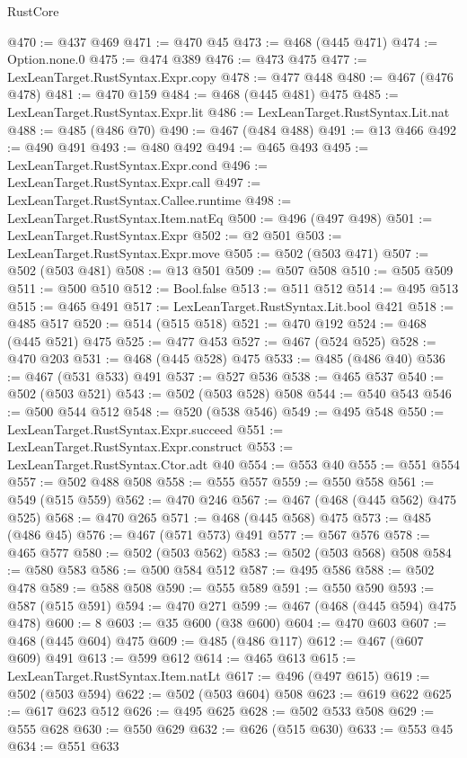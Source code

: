 \begin{lexlean}{RustCore}
\begin{coremodule}
@470 := @437 @469
@471 := @470 @45
@473 := @468 (@445 @471)
@474 := Option.none.{0}
@475 := @474 @389
@476 := @473 @475
@477 := LexLeanTarget.RustSyntax.Expr.copy
@478 := @477 @448
@480 := @467 (@476 @478)
@481 := @470 @159
@484 := @468 (@445 @481) @475
@485 := LexLeanTarget.RustSyntax.Expr.lit
@486 := LexLeanTarget.RustSyntax.Lit.nat
@488 := @485 (@486 @70)
@490 := @467 (@484 @488)
@491 := @13 @466
@492 := @490 @491
@493 := @480 @492
@494 := @465 @493
@495 := LexLeanTarget.RustSyntax.Expr.cond
@496 := LexLeanTarget.RustSyntax.Expr.call
@497 := LexLeanTarget.RustSyntax.Callee.runtime
@498 := LexLeanTarget.RustSyntax.Item.natEq
@500 := @496 (@497 @498)
@501 := LexLeanTarget.RustSyntax.Expr
@502 := @2 @501
@503 := LexLeanTarget.RustSyntax.Expr.move
@505 := @502 (@503 @471)
@507 := @502 (@503 @481)
@508 := @13 @501
@509 := @507 @508
@510 := @505 @509
@511 := @500 @510
@512 := Bool.false
@513 := @511 @512
@514 := @495 @513
@515 := @465 @491
@517 := LexLeanTarget.RustSyntax.Lit.bool @421
@518 := @485 @517
@520 := @514 (@515 @518)
@521 := @470 @192
@524 := @468 (@445 @521) @475
@525 := @477 @453
@527 := @467 (@524 @525)
@528 := @470 @203
@531 := @468 (@445 @528) @475
@533 := @485 (@486 @40)
@536 := @467 (@531 @533) @491
@537 := @527 @536
@538 := @465 @537
@540 := @502 (@503 @521)
@543 := @502 (@503 @528) @508
@544 := @540 @543
@546 := @500 @544 @512
@548 := @520 (@538 @546)
@549 := @495 @548
@550 := LexLeanTarget.RustSyntax.Expr.succeed
@551 := LexLeanTarget.RustSyntax.Expr.construct
@553 := LexLeanTarget.RustSyntax.Ctor.adt @40
@554 := @553 @40
@555 := @551 @554
@557 := @502 @488 @508
@558 := @555 @557
@559 := @550 @558
@561 := @549 (@515 @559)
@562 := @470 @246
@567 := @467 (@468 (@445 @562) @475 @525)
@568 := @470 @265
@571 := @468 (@445 @568) @475
@573 := @485 (@486 @45)
@576 := @467 (@571 @573) @491
@577 := @567 @576
@578 := @465 @577
@580 := @502 (@503 @562)
@583 := @502 (@503 @568) @508
@584 := @580 @583
@586 := @500 @584 @512
@587 := @495 @586
@588 := @502 @478
@589 := @588 @508
@590 := @555 @589
@591 := @550 @590
@593 := @587 (@515 @591)
@594 := @470 @271
@599 := @467 (@468 (@445 @594) @475 @478)
@600 := 8
@603 := @35 @600 (@38 @600)
@604 := @470 @603
@607 := @468 (@445 @604) @475
@609 := @485 (@486 @117)
@612 := @467 (@607 @609) @491
@613 := @599 @612
@614 := @465 @613
@615 := LexLeanTarget.RustSyntax.Item.natLt
@617 := @496 (@497 @615)
@619 := @502 (@503 @594)
@622 := @502 (@503 @604) @508
@623 := @619 @622
@625 := @617 @623 @512
@626 := @495 @625
@628 := @502 @533 @508
@629 := @555 @628
@630 := @550 @629
@632 := @626 (@515 @630)
@633 := @553 @45
@634 := @551 @633

\end{coremodule}
\end{lexlean}

